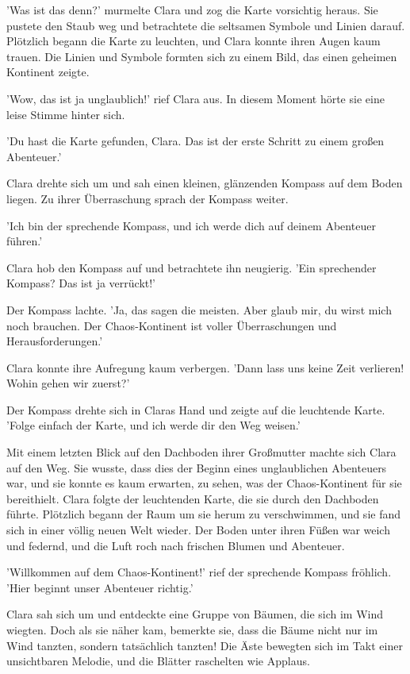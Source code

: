 \documentclass[12pt]{article}
\begin{document}
'Was ist das denn?' murmelte Clara und zog die Karte vorsichtig heraus. Sie pustete den Staub weg und betrachtete die seltsamen Symbole und Linien darauf. Plötzlich begann die Karte zu leuchten, und Clara konnte ihren Augen kaum trauen. Die Linien und Symbole formten sich zu einem Bild, das einen geheimen Kontinent zeigte.

'Wow, das ist ja unglaublich!' rief Clara aus. In diesem Moment hörte sie eine leise Stimme hinter sich.

'Du hast die Karte gefunden, Clara. Das ist der erste Schritt zu einem großen Abenteuer.'

Clara drehte sich um und sah einen kleinen, glänzenden Kompass auf dem Boden liegen. Zu ihrer Überraschung sprach der Kompass weiter.

'Ich bin der sprechende Kompass, und ich werde dich auf deinem Abenteuer führen.'

Clara hob den Kompass auf und betrachtete ihn neugierig. 'Ein sprechender Kompass? Das ist ja verrückt!'

Der Kompass lachte. 'Ja, das sagen die meisten. Aber glaub mir, du wirst mich noch brauchen. Der Chaos-Kontinent ist voller Überraschungen und Herausforderungen.'

Clara konnte ihre Aufregung kaum verbergen. 'Dann lass uns keine Zeit verlieren! Wohin gehen wir zuerst?'

Der Kompass drehte sich in Claras Hand und zeigte auf die leuchtende Karte. 'Folge einfach der Karte, und ich werde dir den Weg weisen.'

Mit einem letzten Blick auf den Dachboden ihrer Großmutter machte sich Clara auf den Weg. Sie wusste, dass dies der Beginn eines unglaublichen Abenteuers war, und sie konnte es kaum erwarten, zu sehen, was der Chaos-Kontinent für sie bereithielt. Clara folgte der leuchtenden Karte, die sie durch den Dachboden führte. Plötzlich begann der Raum um sie herum zu verschwimmen, und sie fand sich in einer völlig neuen Welt wieder. Der Boden unter ihren Füßen war weich und federnd, und die Luft roch nach frischen Blumen und Abenteuer.

'Willkommen auf dem Chaos-Kontinent!' rief der sprechende Kompass fröhlich. 'Hier beginnt unser Abenteuer richtig.'

Clara sah sich um und entdeckte eine Gruppe von Bäumen, die sich im Wind wiegten. Doch als sie näher kam, bemerkte sie, dass die Bäume nicht nur im Wind tanzten, sondern tatsächlich tanzten! Die Äste bewegten sich im Takt einer unsichtbaren Melodie, und die Blätter raschelten wie Applaus.
\end{document}
